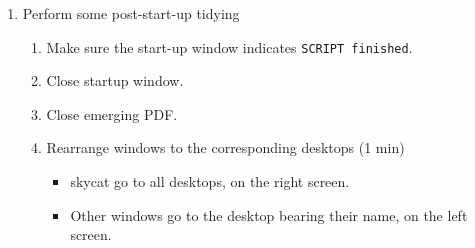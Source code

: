 \documentclass[11pt,fleqn,a4paper]{book}
\begin{document}
\begin{enumerate}
\begin{enumerate}
\begin{enumerate}
             \item One asks to check for CCD alarms to be enabled ()\\
                   Go to the large, black text window where all numbers below the two \texttt{Al Enab} should be ones.
             \item One asks to check that the flat-field lamp is off and \gls{telemetry} active.
                \begin{enumerate}
                 \item If flat-field lamp is on, turn it off unless you will do \gls{dome flats}.\\
                   On \texttt{FAUX functions} panel select \texttt{OFF} under \texttt{FLAT FIELD LAMP}          
                 \item On the \texttt{Telemetry} panel, ensure that the FEROS \gls{telemetry} module is \texttt{active}\\
                       If not, activate it on the FEROS screen using \gls{fcdTelemetry} (see )
                 \item On the \texttt{Telemetry} panel, ensure that the WFI \gls{telemetry} module is \texttt{active}\\
                       If not, activate it on the WFI screen using \gls{fcdTelemetry} (see )
                 \item If a \gls{telemetry} was restarted, panel must be closed and reopened (see )
                 \end{enumerate}
          \end{enumerate}
          \newpage
          \item Perform some post-start-up tidying
                \begin{enumerate}
                   \item Make sure the start-up window indicates \texttt{SCRIPT finished}.\label{list:tcsbooted}
                   \item Close startup window.
                   \item Close emerging PDF.
                   \item Rearrange windows to the corresponding \gls{desktop}s (1 min)
             \begin{itemize}
                \item \gls{skycat} go to all \gls{desktop}s, on the right screen.
                \item Other windows go to the \gls{desktop} bearing their name, on the left screen. 

\end{itemize}
\end{enumerate}
\end{enumerate}
\end{enumerate}
\end{document}

